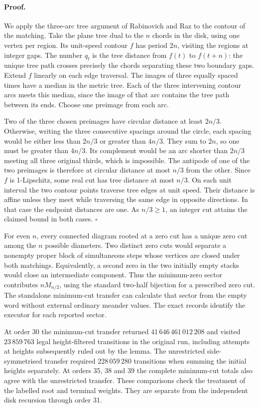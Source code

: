 \paragraph{Proof.}
We apply the three-arc tree argument of Rabinovich and Raz
\cite[Propositions 5.1--5.2]{rabinovich} to the contour of the matching.
Take the plane tree dual to the \(n\) chords in the disk, using one vertex
per region. Its unit-speed contour \(f\) has period \(2n\), visiting the
regions at integer gaps. The number \(q_t\) is the tree distance from
\(f(t)\) to \(f(t+n)\): the unique tree path crosses precisely the chords
separating these two boundary gaps. Extend \(f\) linearly on each edge
traversal. The images of three equally spaced times have a median in the
metric tree. Each of the three intervening contour arcs meets this median,
since the image of that arc contains the tree path between its ends.
Choose one preimage from each arc.

Two of the three chosen preimages have circular distance at least
\(2n/3\). Otherwise, writing the three consecutive spacings around the
circle, each spacing would be either less than \(2n/3\) or greater than
\(4n/3\). They sum to \(2n\), so one must be greater than \(4n/3\).
Its complement would be an arc shorter than \(2n/3\) meeting all three
original thirds, which is impossible. The antipode of one of the two
preimages is therefore at circular distance at most \(n/3\) from the
other. Since \(f\) is 1-Lipschitz, some real cut has tree distance at most
\(n/3\). On each unit interval the two contour points traverse tree edges
at unit speed. Their distance is affine unless they meet while traversing
the same edge in opposite directions. In that case the endpoint distances
are one. As \(n/3\ge1\), an integer cut attains the claimed bound in both
cases. \hfill\(\square\)

For even \(n\), every connected diagram rooted at a zero cut has a unique
zero cut among the \(n\) possible diameters. Two distinct zero cuts would
separate a nonempty proper block of simultaneous steps whose vertices are
closed under both matchings. Equivalently, a second zero in the two
initially empty stacks would close an intermediate component. Thus the
minimum-zero sector contributes \(nM_{n/2}\), using the standard two-half
bijection for a prescribed zero cut. The standalone minimum-cut transfer
can calculate that sector from the empty word without external ordinary
meander values. The exact records identify the executor for each reported
sector.

At order 30 the minimum-cut transfer returned \(41\,646\,461\,012\,208\)
and visited \(23\,859\,763\) legal height-filtered transitions in the
original run, including attempts at heights subsequently ruled out by
the lemma. The unrestricted side-symmetrised transfer required
\(228\,059\,280\) transitions when summing the initial heights separately.
At orders 35, 38 and 39 the complete minimum-cut totals also agree with
the unrestricted transfer. These comparisons check the treatment of the
labelled root and terminal weights. They are separate from the independent
disk recursion through order 31.

